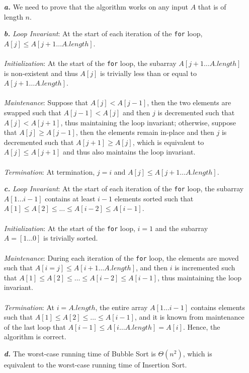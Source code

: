 \noindent\begin{enumerate}
	\item[\textbf{\textit{a.}}] We need to prove that the algorithm works on any input $A$ that is of length $n$.

	\item[\textbf{\textit{b.}}] \textit{Loop Invariant}: At the start of each iteration of the \texttt{for} loop, $A[j] \leq A[j+1 \ldots A.length]$. \\ \\
				    \textit{Initialization}: At the start of the \texttt{for} loop, the subarray $A[j+1 \ldots A.length]$ is non-existent and thus $A[j]$ is trivially less than or equal to $A[j+1 \ldots A.length]$. \\ \\
				    \textit{Maintenance}: Suppose that $A[j] < A[j-1]$, then the two elements are swapped such that $A[j-1] < A[j]$ and then $j$ is decremented such that $A[j] < A[j+1]$, thus maintaining the loop invariant; otherwise, suppose that $A[j] \geq A[j-1]$, then the elements remain in-place and then $j$ is decremented such that $A[j+1] \geq A[j]$, which is equivalent to $A[j] \leq A[j+1]$ and thus also maintains the loop invariant. \\ \\
				    \textit{Termination}: At termination, $j=i$ and $A[j] \leq A[j+1 \ldots A.length]$.

	\item[\textbf{\textit{c.}}] \textit{Loop Invariant}: At the start of each iteration of the \texttt{for} loop, the subarray $A[1 \ldots i-1]$ contains at least $i-1$ elements sorted such that $A[1] \leq A[2] \leq ... \leq A[i-2] \leq A[i-1]$. \\ \\
				    \textit{Initialization}: At the start of the \texttt{for} loop, $i=1$ and the subarray $A=[1 \ldots 0]$ is trivially sorted. \\ \\
				    \textit{Maintenance}: During each iteration of the \texttt{for} loop, the elements are moved such that $A[i = j] \leq A[i+1 \ldots A.length]$, and then $i$ is incremented such that $A[1] \leq A[2] \leq \ldots \leq A[i-2] \leq A[i-1]$, thus maintaining the loop invariant. \\ \\
				    \textit{Termination}: At $i = A.length$, the entire array $A[1 \ldots i-1]$ contains elements such that $A[1] \leq A[2] \leq \ldots \leq A[i-1]$, and it is known from maintenance of the last loop that $A[i-1] \leq A[i \ldots A.length] = A[i]$. Hence, the algorithm is correct.

	\item[\textbf{\textit{d.}}] The worst-case running time of Bubble Sort is $\Theta(n^2)$, which is equivalent to the worst-case running time of Insertion Sort.
\end{enumerate}
